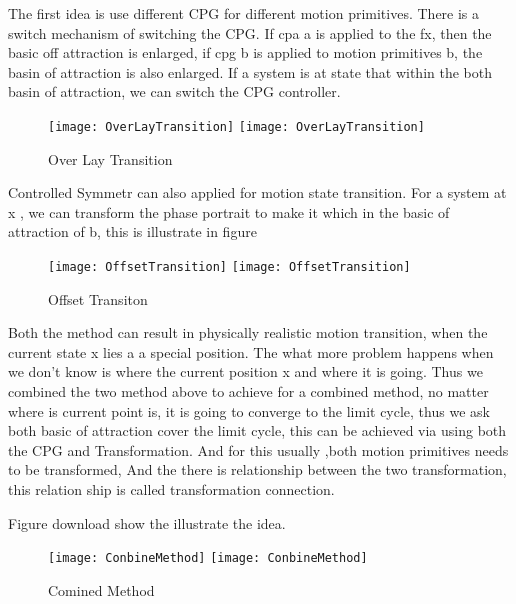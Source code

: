 \begin{itemize}
The first idea is use different CPG for different motion primitives. There is a switch mechanism of switching the CPG.
If cpa a is applied to the fx, then the basic off attraction is enlarged, if cpg b is applied to motion primitives b,
the basin of attraction is also enlarged.
If a system is at state that within the both basin of attraction, we can switch the CPG controller.

\begin{figure}[!htbp]
  \begin{center}
    \leavevmode
    \ifpdf
      \texttt{[image: OverLayTransition]}
    \else
      \texttt{[image: OverLayTransition]}
    \fi
    \caption{Over Lay Transition}
    \label{fig:motion-transition}
  \end{center}
\end{figure}


Controlled Symmetr can also applied for motion state transition.
For a system at x , we can transform the phase portrait to make it which in the basic of attraction of b,
this is illustrate in figure 


\begin{figure}[!htbp]
  \begin{center}
    \leavevmode
    \ifpdf
      \texttt{[image: OffsetTransition]}
    \else
      \texttt{[image: OffsetTransition]}
    \fi
    \caption{Offset Transiton}
    \label{fig:transform-transit}
  \end{center}
\end{figure}
\end{itemize}




Both the method can result in physically realistic motion transition, when the current state x lies a a special position.
The what more problem happens when we don't know is where the current position x and where it is going.
Thus we combined the two method above to achieve for a combined method,
no matter where is current point is, it is going to converge to the limit cycle, thus we ask both basic of attraction cover the limit cycle, this can be achieved via using both the CPG and Transformation.
And for this usually ,both motion primitives needs to be transformed,
And the there is relationship between the two transformation,  this relation ship is called transformation connection.

Figure download show the illustrate the idea.

\begin{figure}[!htbp]
  \begin{center}
    \leavevmode
    \ifpdf
      \texttt{[image: ConbineMethod]}
    \else
      \texttt{[image: ConbineMethod]}
    \fi
    \caption{Comined Method}
    \label{fig:Combine}
  \end{center}
\end{figure}


